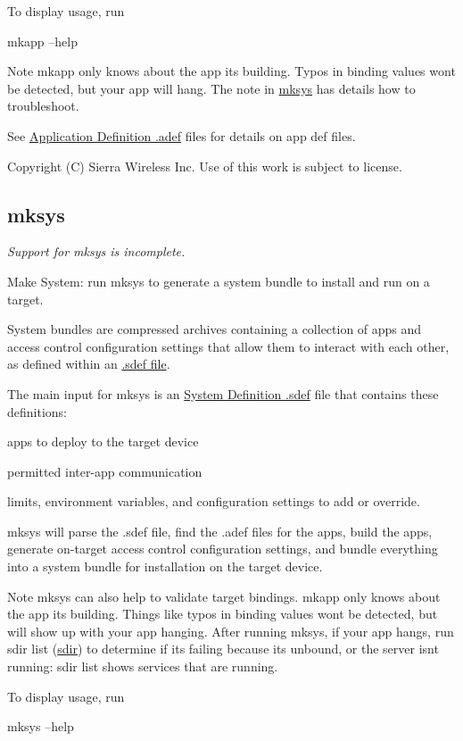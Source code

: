 To display usage, run \begin{DoxyVerb}mkapp --help\end{DoxyVerb}


\begin{DoxyNote}{Note}
{\ttfamily mkapp} only knows about the app it\textquotesingle{}s building. Typos in binding values won\textquotesingle{}t be detected, but your app will hang. The note in \hyperlink{buildToolsmksys}{mksys} has details how to troubleshoot.
\end{DoxyNote}
See \hyperlink{defFilesAdef}{Application Definition .adef} files for details on app def files.





Copyright (C) Sierra Wireless Inc. Use of this work is subject to license. \hypertarget{buildToolsmksys}{}\subsection{mksys}\label{buildToolsmksys}
{\itshape Support for {\ttfamily mksys} is incomplete.} ~\newline


Make System\+: run {\ttfamily mksys} to generate a system bundle to install and run on a target.

System bundles are compressed archives containing a collection of apps and access control configuration settings that allow them to interact with each other, as defined within an \hyperlink{defFilesSdef}{.sdef file}.

The main input for {\ttfamily mksys} is an \hyperlink{defFilesSdef}{System Definition .sdef} file that contains these definitions\+:
\begin{DoxyItemize}
\item apps to deploy to the target device
\item permitted inter-\/app communication
\item limits, environment variables, and configuration settings to add or override.
\end{DoxyItemize}

{\ttfamily mksys} will parse the .sdef file, find the .adef files for the apps, build the apps, generate on-\/target access control configuration settings, and bundle everything into a system bundle for installation on the target device.

\begin{DoxyNote}{Note}
{\ttfamily mksys} can also help to validate target bindings. {\ttfamily mkapp} only knows about the app it\textquotesingle{}s building. Things like typos in binding values won\textquotesingle{}t be detected, but will show up with your app hanging. After running mksys, if your app hangs, run {\ttfamily sdir list} (\hyperlink{toolsTarget_sdir}{sdir}) to determine if it\textquotesingle{}s failing because it\textquotesingle{}s unbound, or the server isn\textquotesingle{}t running\+: {\ttfamily sdir} list shows services that are running.
\end{DoxyNote}
To display usage, run \begin{DoxyVerb}mksys --help\end{DoxyVerb}


